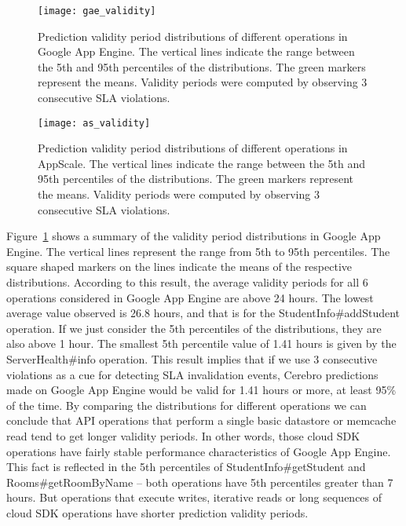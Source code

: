 \begin{figure}
\centering
\texttt{[image: gae\_validity]}
\caption{Prediction validity period distributions of different operations in Google App Engine. The vertical lines indicate the range between the 5th and 95th percentiles of the distributions. The green markers represent the means. Validity periods were computed by observing 3 consecutive SLA
violations.}
\label{fig:gae_validity}
\end{figure}

\begin{figure}
\centering
\texttt{[image: as\_validity]}
\caption{Prediction validity period distributions of different operations in AppScale. The vertical lines indicate the range between the 5th and 95th percentiles of the distributions. The green markers represent the means. Validity periods were computed by observing 3 consecutive SLA
violations.}
\label{fig:as_validity}
\end{figure}

Figure~\ref{fig:gae_validity} shows a summary of the validity period distributions in Google App Engine. The
vertical lines represent the range from 5th to 95th percentiles. The square shaped markers on the lines indicate the means of the
respective distributions. According to this result, the average validity periods for all 6 operations considered in Google App Engine are
above 24 hours. The lowest average value observed is 26.8 hours, and that is for the StudentInfo\#addStudent operation. If we
just consider the 5th percentiles of the distributions, they are also above 1 hour. The smallest 5th percentile value of 1.41 hours is 
given by the ServerHealth\#info operation. This result implies that if we use 3 consecutive violations as a cue for detecting SLA
invalidation events, Cerebro predictions made on Google App Engine would be valid for 1.41 hours or more, at least 95\% of the time.
By comparing the distributions for different operations we can conclude that API operations that perform a single basic datastore or
memcache read tend to get longer validity periods. In other words, those cloud SDK operations have fairly stable performance
characteristics of Google App Engine. This fact is reflected in the 5th percentiles of StudentInfo\#getStudent and
Rooms\#getRoomByName -- both operations have 5th percentiles greater than 7 hours. But operations that execute writes, iterative
reads or long sequences of cloud SDK operations have shorter prediction validity periods.

